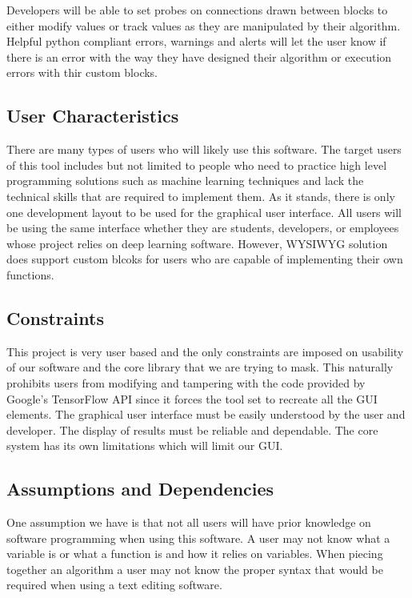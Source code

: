 \documentclass[journal,10pt,onecolumn,compsoc]{IEEEtran} \usepackage[margin=1.0in]{geometry} \usepackage{pdfpages} \usepackage{graphicx}
\begin{document}
Developers will be able to set probes on connections drawn between blocks to either modify values or track values as they are manipulated by their algorithm.
Helpful python compliant errors, warnings and alerts will let the user know if there is an error with the way they have designed their algorithm or execution errors with thir custom blocks.

\subsection{User Characteristics}

There are many types of users who will likely use this software. 
The target users of this tool includes but not limited to people who need to practice high level programming solutions such as machine learning techniques and lack the technical skills that are required to implement them.
As it stands, there is only one development layout to be used for the graphical user interface.
All users will be using the same interface whether they are students, developers, or employees whose project relies on deep learning software. 
However, WYSIWYG solution does support custom blcoks for users who are capable of implementing their own functions.

\subsection{Constraints}

This project is very user based and the only constraints are imposed on usability of our software and the core library that we are trying to mask. 
This naturally prohibits users from modifying and tampering with the code provided by Google's TensorFlow API since it forces the tool set to recreate all the GUI elements.
The graphical user interface must be easily understood by the user and developer.
The display of results must be reliable and dependable.
The core system has its own limitations which will limit our GUI.

\subsection{Assumptions and Dependencies}

One assumption we have is that not all users will have prior knowledge on software programming when using this software.
A user may not know what a variable is or what a function is and how it relies on variables. 
When piecing together an algorithm a user may not know the proper syntax that would be required when using a text editing software.
\end{document}
